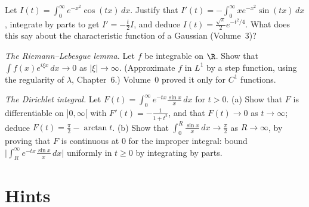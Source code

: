 \begin{exercise}[$\star\star$]\label{ex:gausscos}
Let $I(t)=\int_0^\infty e^{-x^2}\cos(tx)\,dx$. Justify that $I'(t)=-\int_0^\infty xe^{-x^2}\sin(tx)\,dx$, integrate by parts to get $I'=-\frac t2I$, and deduce $I(t)=\frac{\sqrt\pi}2e^{-t^2/4}$. What does this say about
the characteristic function of a Gaussian (Volume~3)?
\end{exercise}

\begin{exercise}[$\star\star$]\label{ex:rlemma}
\emph{The Riemann--Lebesgue lemma.} Let $f$ be integrable on $\R$. Show that $\int f(x)e^{i\xi x}\,dx\to0$ as $|\xi|\to\infty$. (Approximate $f$ in $L^1$ by a step function, using the regularity of
$\lambda$, Chapter~6.) Volume~0 proved it only for $C^1$ functions.
\end{exercise}

\begin{exercise}[$\star\star\star$]\label{ex:dirichlet}
\emph{The Dirichlet integral.} Let $F(t)=\int_0^\infty e^{-tx}\frac{\sin x}x\,dx$ for $t>0$. (a) Show that $F$ is differentiable on $]0,\infty[$ with $F'(t)=-\frac1{1+t^2}$, and that $F(t)\to0$ as $t\to\infty$; deduce
$F(t)=\frac\pi2-\arctan t$. (b) Show that $\int_0^R\frac{\sin x}x\,dx\to\frac\pi2$ as $R\to\infty$, by proving that $F$ is continuous at $0$ for the improper integral: bound
$\bigl|\int_R^\infty e^{-tx}\frac{\sin x}x\,dx\bigr|$ uniformly in $t\ge0$ by integrating by parts.
\end{exercise}

\section{Hints}

